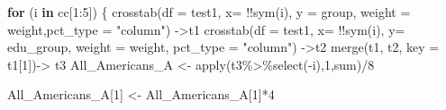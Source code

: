 \documentclass[
]{article}
\newenvironment{Shaded}{\begin{snugshade}}{\end{snugshade}}
\newcommand{\AttributeTok}[1]{\textcolor[rgb]{0.77,0.63,0.00}{#1}}
\newcommand{\ControlFlowTok}[1]{\textcolor[rgb]{0.13,0.29,0.53}{\textbf{#1}}}
\newcommand{\DecValTok}[1]{\textcolor[rgb]{0.00,0.00,0.81}{#1}}
\newcommand{\FunctionTok}[1]{\textcolor[rgb]{0.00,0.00,0.00}{#1}}
\newcommand{\NormalTok}[1]{#1}
\newcommand{\OtherTok}[1]{\textcolor[rgb]{0.56,0.35,0.01}{#1}}
\newcommand{\SpecialCharTok}[1]{\textcolor[rgb]{0.00,0.00,0.00}{#1}}
\newcommand{\StringTok}[1]{\textcolor[rgb]{0.31,0.60,0.02}{#1}}
\begin{document}
\begin{Shaded}
\begin{Highlighting}[]
\ControlFlowTok{for}\NormalTok{ (i }\ControlFlowTok{in}\NormalTok{ cc[}\DecValTok{1}\SpecialCharTok{:}\DecValTok{5}\NormalTok{]) \{}
  \FunctionTok{crosstab}\NormalTok{(}\AttributeTok{df =}\NormalTok{ test1, }\AttributeTok{x=} \SpecialCharTok{!!}\FunctionTok{sym}\NormalTok{(i), }\AttributeTok{y =}\NormalTok{ group, }\AttributeTok{weight =}\NormalTok{ weight,}\AttributeTok{pct\_type =} \StringTok{"column"}\NormalTok{) }\OtherTok{{-}\textgreater{}}\NormalTok{t1}
  \FunctionTok{crosstab}\NormalTok{(}\AttributeTok{df =}\NormalTok{ test1, }\AttributeTok{x=} \SpecialCharTok{!!}\FunctionTok{sym}\NormalTok{(i), }\AttributeTok{y=}\NormalTok{ edu\_group, }\AttributeTok{weight =}\NormalTok{ weight, }\AttributeTok{pct\_type =} \StringTok{"column"}\NormalTok{) }\OtherTok{{-}\textgreater{}}\NormalTok{t2}
\FunctionTok{merge}\NormalTok{(t1, t2, }\AttributeTok{key =}\NormalTok{ t1[}\DecValTok{1}\NormalTok{])}\OtherTok{{-}\textgreater{}}\NormalTok{ t3}
\NormalTok{All\_Americans\_A }\OtherTok{\textless{}{-}} \FunctionTok{apply}\NormalTok{(t3}\SpecialCharTok{\%\textgreater{}\%}\FunctionTok{select}\NormalTok{(}\SpecialCharTok{{-}}\NormalTok{i),}\DecValTok{1}\NormalTok{,sum)}\SpecialCharTok{/}\DecValTok{8}

\NormalTok{All\_Americans\_A[}\DecValTok{1}\NormalTok{] }\OtherTok{\textless{}{-}}\NormalTok{ All\_Americans\_A[}\DecValTok{1}\NormalTok{]}\SpecialCharTok{*}\DecValTok{4}


\end{Highlighting}
\end{Shaded}
\end{document}
